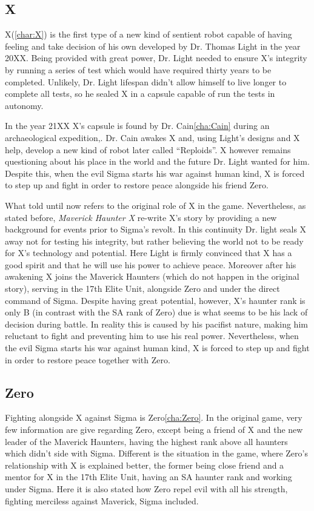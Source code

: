 \subsection{X}
X(\ref{char:X}) is the first type of a new kind of sentient robot capable of having feeling and take decision of his own developed by Dr. Thomas Light in the year 20XX. Being provided with great power, Dr. Light needed to ensure X's integrity by running a series of test which would have required thirty years to be completed. Unlikely, Dr. Light lifespan didn't allow himself to live longer to complete all tests, so he sealed X in a capsule capable of run the tests in autonomy.


In the year 21XX X's capsule is found by Dr. Cain\ref{cha:Cain} during an archaeological expedition\cite{X:Manual},\cite{wiki:Cain_journal}. Dr. Cain awakes X and, using Light's designs and X help, develop a new kind of robot later called ``Reploids''. X however remains questioning about his place in the world and the future Dr. Light wanted for him. Despite this, when the evil Sigma starts his war against human kind, X is forced to step up and fight in order to restore peace alongside his friend Zero. 


What told until now refers to the original role of X in the \x game. Nevertheless, as stated before, \textit{Maverick Haunter X} re-write X's story by providing a new background for events prior to Sigma's revolt. In this continuity Dr. light seals X away not for testing his integrity, but rather believing the world not to be ready for X's technology and potential. Here Light is firmly convinced that X has a good spirit and that he will use his power to achieve peace\cite{wiki:MM_MHX_X}. Moreover after his awakening X joins the Maverick Haunters (which do not happen in the original story), serving in the 17th Elite Unit, alongside Zero and under the direct command of Sigma. Despite having great potential, however, X's haunter rank is only B (in contrast with the SA rank of Zero) due is what seems to be his lack of decision during battle. In reality this is caused by his pacifist nature, making him reluctant to fight and preventing him to use his real power\cite{Xcoll1:Manual_X1}. Nevertheless, when the evil Sigma starts his war against human kind, X is forced to step up and fight in order to restore peace together with Zero.
\subsection{Zero}
Fighting alongside X against Sigma is Zero\ref{cha:Zero}. In the original \x game, very few information are give regarding Zero, except being a friend of X and the new leader of the Maverick Haunters\cite{X:Manual}, having the highest rank above all haunters which didn't side with Sigma. 
Different is the situation in the \mhx game, where Zero's relationship with X is explained better, the former being close friend and a mentor for X in the 17th Elite Unit, having an SA haunter rank and working under Sigma. Here it is also stated how Zero repel evil with all his strength, fighting merciless against Maverick, Sigma included\cite{Xcoll1:Manual_X1}.  

